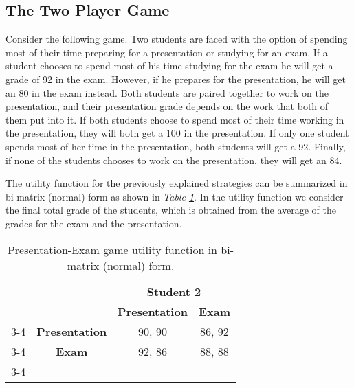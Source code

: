 \documentclass[twoside]{article}
\begin{document}
\subsection{The Two Player Game}
Consider the following game. Two students are faced with the option of spending most of their time preparing for a presentation or studying for an exam. If a student chooses to spend most of his time studying for the exam he will get a grade of 92 in the exam. However, if he prepares for the presentation, he will get an 80 in the exam instead. Both students are paired together to work on the presentation, and their presentation grade depends on the work that both of them put into it. If both students choose to spend most of their time working in the presentation, they will both get a 100 in the presentation. If only one student spends most of her time in the presentation, both students will get a 92. Finally, if none of the students chooses to work on the presentation, they will get an 84.

The utility function for the previously explained strategies can be summarized in bi-matrix (normal) form as shown in {\em Table \ref{table:presentation1}}. In the utility function we consider the final total grade of the students, which is obtained from the average of the grades for the exam and the presentation.

\begin{table}[ht]
\begin{center}
\caption{Presentation-Exam game utility function in bi-matrix (normal) form.}
\label{table:presentation1}
\begin{tabular}{l l p{7em} p{7em}}
                                                        &                                            & \multicolumn{2}{c}{\textbf{Student 2}}                    \\
                                                        &                                            & \textbf{Presentation}       & \textbf{Exam}               \\ \cline{3-4} 
\multicolumn{1}{c}{\multirow{2}{*}{\textbf{Student 1}}} & \multicolumn{1}{c|}{\textbf{Presentation}} & \multicolumn{1}{c|}{90, 90} & \multicolumn{1}{c|}{86, 92} \\ \cline{3-4} 
\multicolumn{1}{c}{}                                    & \multicolumn{1}{c|}{\textbf{Exam}}         & \multicolumn{1}{c|}{92, 86} & \multicolumn{1}{c|}{88, 88} \\ \cline{3-4} 
\end{tabular}
\end{center}
\end{table}
\end{document}
